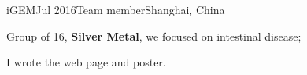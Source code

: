 \ifx\lang\eng
	\begin{rSubsection}{iGEM}{Jul 2016}{Team member}{Shanghai, China}
		\item Group of 16, \textbf{Silver Metal}, we focused on intestinal disease;
		\item I wrote the web page and poster.
	\end{rSubsection}
\fi